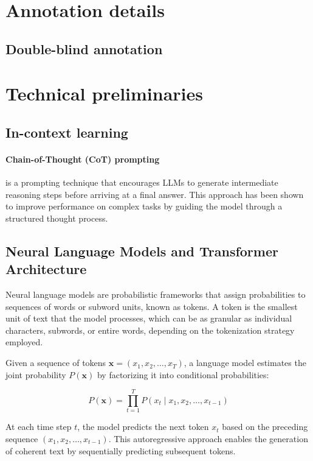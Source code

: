 \section{Annotation details} \label{app:annotation}

\subsection{Double-blind annotation}

\section{Technical preliminaries} \label{app:technicality}

\subsection{In-context learning}

\paragraph{Chain-of-Thought (CoT) prompting} \citep{weiChainofThoughtPromptingElicits2023} is a prompting technique that encourages LLMs to generate intermediate reasoning steps before arriving at a final answer. This approach has been shown to improve performance on complex tasks by guiding the model through a structured thought process.

\subsection{Neural Language Models and Transformer Architecture} \label{app:llm-transformer}

Neural language models are probabilistic frameworks that assign probabilities to sequences of words or subword units, known as tokens. A token is the smallest unit of text that the model processes, which can be as granular as individual characters, subwords, or entire words, depending on the tokenization strategy employed.

Given a sequence of tokens \( \mathbf{x} = (x_1, x_2, \ldots, x_T) \), a language model estimates the joint probability \( P(\mathbf{x}) \) by factorizing it into conditional probabilities:

\[
P(\mathbf{x}) = \prod_{t=1}^T P(x_t \mid x_1, x_2, \ldots, x_{t-1})
\]

At each time step \( t \), the model predicts the next token \( x_t \) based on the preceding sequence \( (x_1, x_2, \ldots, x_{t-1}) \). This autoregressive approach enables the generation of coherent text by sequentially predicting subsequent tokens.


